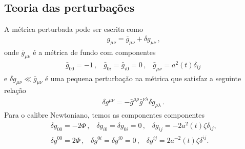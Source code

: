 \documentclass[
	12pt,				%
	openright,			%
	oneside,			%
	a4paper,			%
	english,			%
	french,				%
	spanish,			%
	brazil				%
	]{abntex2}
\begin{document}

%
%
%


\begin{apendicesenv}

\partapendices

\chapter{Teoria das perturbações}\label{ApA}
%
A métrica perturbada pode ser escrita como
\begin{eqnarray}\label{A1}
g_{\mu\nu}=\bar{g}_{\mu\nu}+\delta g_{\mu\nu}\,\mbox{,}
\end{eqnarray}
onde $\bar{g}_{\mu\nu}$ é a métrica de fundo com componentes
\begin{eqnarray}\label{A2}
\bar{g}_{00}=-1\,\mbox{,}\quad \bar{g}_{0i}=\bar{g}_{i0}=0\,\mbox{,} \quad \bar{g}_{\mu\nu}=a^{2}(t)\delta_{ij}
\end{eqnarray}
e $\delta g_{\mu\nu}\ll \bar{g}_{\mu\nu}$ é uma pequena perturbação na métrica que satisfaz a seguinte relação
\begin{eqnarray}\label{A3}
\delta g^{\mu\nu}=-\bar{g}^{\mu\rho}\bar{g}^{\nu\lambda}\delta g_{\rho\lambda}\,\mbox{.}
\end{eqnarray}
Para o calibre Newtoniano, temos as componentes componentes
\begin{eqnarray}\label{A4}
\delta g_{00}=-2\Phi \,\mbox{,}\quad \delta g_{i0}=\delta g_{0i}=0\,\mbox{,}\quad \delta g_{ij}=-2a^{2}(t)\zeta\delta_{ij}\mbox{,}\nonumber\\
\delta g^{00}=2\Phi \,\mbox{,}\quad \delta g^{0i}=\delta g^{i0}=0\,\mbox{,}\quad \delta g^{ij}=2a^{-2}(t)\zeta\delta^{ij}\mbox{.}
\end{eqnarray}


\end{apendicesenv}
\end{document}
